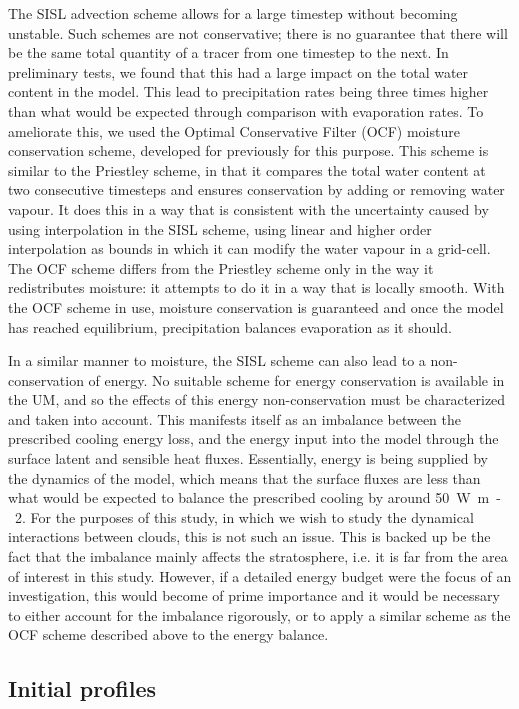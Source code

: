 \documentclass[11pt,a4paper]{article}
\begin{document}
The SISL advection scheme allows for a large timestep without becoming unstable. Such schemes are not conservative; there is no guarantee that there will be the same total quantity of a tracer from one timestep to the next. In preliminary tests, we found that this had a large impact on the total water content in the model. This lead to precipitation rates being three times higher than what would be expected through comparison with evaporation rates. To ameliorate this, we used the Optimal Conservative Filter (OCF) moisture conservation scheme, developed for previously for this purpose. This scheme is similar to the Priestley scheme, in that it compares the total water content at two consecutive timesteps and ensures conservation by adding or removing water vapour. It does this in a way that is consistent with the uncertainty caused by using interpolation in the SISL scheme, using linear and higher order interpolation as bounds in which it can modify the water vapour in a grid-cell. The OCF scheme differs from the Priestley scheme only in the way it redistributes moisture: it attempts to do it in a way that is locally smooth. With the OCF scheme in use, moisture conservation is guaranteed and once the model has reached equilibrium, precipitation balances evaporation as it should.

In a similar manner to moisture, the SISL scheme can also lead to a non-conservation of energy. No suitable scheme for energy conservation is available in the UM, and so the effects of this energy non-conservation must be characterized and taken into account. This manifests itself as an imbalance between the prescribed cooling energy loss, and the energy input into the model through the surface latent and sensible heat fluxes. Essentially, energy is being supplied by the dynamics of the model, which means that the surface fluxes are less than what would be expected to balance the prescribed cooling by around \SI{50}{W.m-2}.
For the purposes of this study, in which we wish to study the dynamical interactions between clouds, this is not such an issue. This is backed up be the fact that the imbalance mainly affects the stratosphere, i.e. it is far from the area of interest in this study. However, if a detailed energy budget were the focus of an investigation, this would become of prime importance and it would be necessary to either account for the imbalance rigorously, or to apply a similar scheme as the OCF scheme described above to the energy balance. 

\subsection{Initial profiles}
\end{document}
